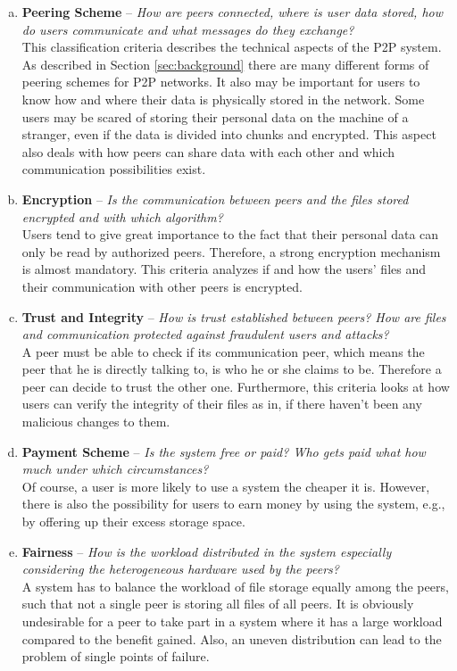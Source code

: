 \begin{enumerate}[(a)]
\item \textbf{Peering Scheme} -- \textit{How are peers connected, where is user data stored, how do users communicate and what messages do they exchange?}\\
This classification criteria describes the technical aspects of the P2P system. As described in Section \ref{sec:background} there are many different forms of peering schemes for P2P networks. It also may be important for users to know how and where their data is physically stored in the network. Some users may be scared of storing their personal data on the machine of a stranger, even if the data is divided into chunks and encrypted. This aspect also deals with how peers can share data with each other and which communication possibilities exist. 

\item \textbf{Encryption} -- \textit{Is the communication between peers and the files stored encrypted and with which algorithm?}\\
Users tend to give great importance to the fact that their personal data can only be read by authorized peers. Therefore, a strong encryption mechanism is almost mandatory. This criteria analyzes if and how the users' files and their communication with other peers is encrypted.

\item \textbf{Trust and Integrity} -- \textit{How is trust established between peers? How are files and communication protected against fraudulent users and attacks?}\\
A peer must be able to check if its communication peer, which means the peer that he is directly talking to, is who he or she claims to be. Therefore a peer can decide to trust the other one. Furthermore, this criteria looks at how users can verify the integrity of their files as in, if there haven't been any malicious changes to them.

\item \textbf{Payment Scheme} -- \textit{Is the system free or paid? Who gets paid what how much under which circumstances?}\\
Of course, a user is more likely to use a system the cheaper it is. However, there is also the possibility for users to earn money by using the system, e.g., by offering up their excess storage space.

\item \textbf{Fairness} -- \textit{How is the workload distributed in the system especially considering the heterogeneous hardware used by the peers?}\\
A system has to balance the workload of file storage equally among the peers, such that not a single peer is storing all files of all peers. It is obviously undesirable for a peer to take part in a system where it has a large workload compared to the benefit gained. Also, an uneven distribution can lead to the problem of single points of failure.


\end{enumerate}
